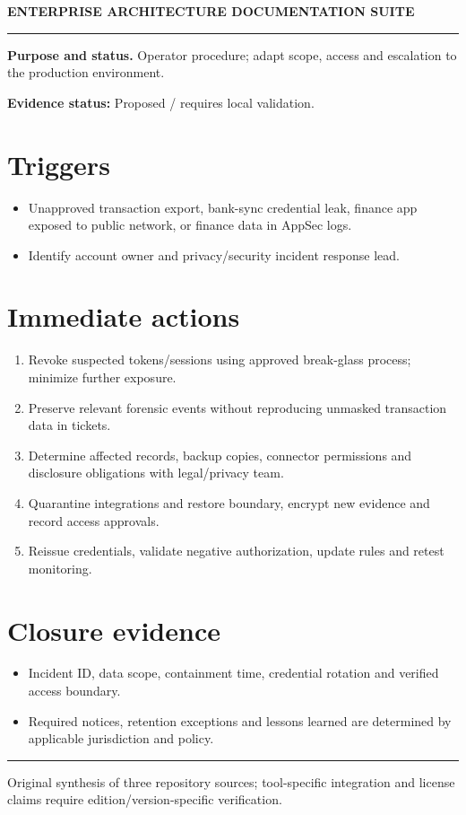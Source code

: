 \documentclass[10pt,letterpaper]{article}
\begin{document}
\begin{center}
{\large\bfseries\color{teal} ENTERPRISE ARCHITECTURE DOCUMENTATION SUITE}\par
{}\par
{}\par
\end{center}
\vspace{8pt}\hrule\vspace{12pt}
\textbf{Purpose and status.} Operator procedure; adapt scope, access and escalation to the production environment.\par
\textbf{Evidence status:} Proposed / requires local validation.\par
\section{Triggers}
\begin{itemize}
\item Unapproved transaction export, bank-sync credential leak, finance app exposed to public network, or finance data in AppSec logs.
\item Identify account owner and privacy/security incident response lead.
\end{itemize}
\section{Immediate actions}
\begin{enumerate}
\item Revoke suspected tokens/sessions using approved break-glass process; minimize further exposure.
\item Preserve relevant forensic events without reproducing unmasked transaction data in tickets.
\item Determine affected records, backup copies, connector permissions and disclosure obligations with legal/privacy team.
\item Quarantine integrations and restore boundary, encrypt new evidence and record access approvals.
\item Reissue credentials, validate negative authorization, update rules and retest monitoring.
\end{enumerate}
\section{Closure evidence}
\begin{itemize}
\item Incident ID, data scope, containment time, credential rotation and verified access boundary.
\item Required notices, retention exceptions and lessons learned are determined by applicable jurisdiction and policy.
\end{itemize}
\vfill\noindent\color{muted}\rule{\linewidth}{0.4pt}\par\scriptsize Original synthesis of three repository sources; tool-specific integration and license claims require edition/version-specific verification.\normalsize
\end{document}
